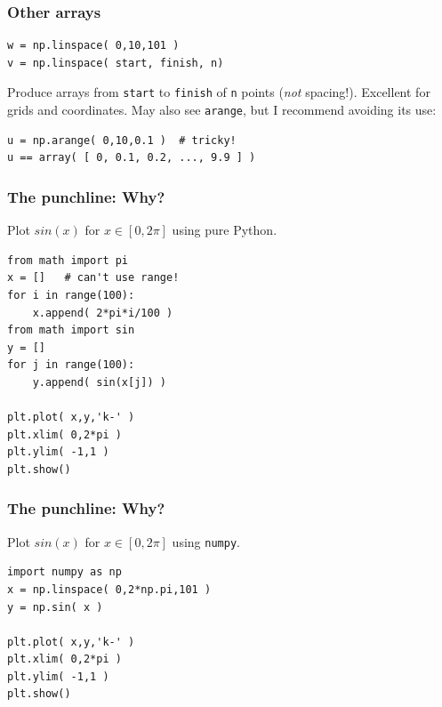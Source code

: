 \documentclass[11pt]{beamer}
\begin{document}
\begin{frame}[fragile]
  \frametitle{Other arrays}
  \Enlarge

  \begin{Verbatim}
w = np.linspace( 0,10,101 )
v = np.linspace( start, finish, n)
  \end{Verbatim}
  \begin{enumerate}
  \myitem  Produce arrays from \texttt{start} to \texttt{finish} of \texttt{n} points (\emph{not} spacing!).
  \myitem  Excellent for grids and coordinates.
  \myitem  May also see \texttt{arange}, but I recommend avoiding its use:
  \end{enumerate}
  \begin{Verbatim}
u = np.arange( 0,10,0.1 )  # tricky!
u == array( [ 0, 0.1, 0.2, ..., 9.9 ] )
  \end{Verbatim}
\end{frame}

\begin{frame}[fragile]
  \frametitle{The punchline:  Why?}
  \Enlarge

  Plot $sin(x)$ for $x \in \left[ 0, 2\pi \right]$ using pure Python.

  \begin{Verbatim}
from math import pi
x = []   # can't use range!
for i in range(100):
    x.append( 2*pi*i/100 )
from math import sin
y = []
for j in range(100):
    y.append( sin(x[j]) )

plt.plot( x,y,'k-' )
plt.xlim( 0,2*pi )
plt.ylim( -1,1 )
plt.show()
  \end{Verbatim}
\end{frame}

\begin{frame}[fragile]
  \frametitle{The punchline:  Why?}
  \Enlarge

  Plot $sin(x)$ for $x \in \left[ 0, 2\pi \right]$ using \texttt{numpy}.

  \begin{Verbatim}
import numpy as np
x = np.linspace( 0,2*np.pi,101 )
y = np.sin( x )

plt.plot( x,y,'k-' )
plt.xlim( 0,2*pi )
plt.ylim( -1,1 )
plt.show()
  \end{Verbatim}
\end{frame}
\end{document}
